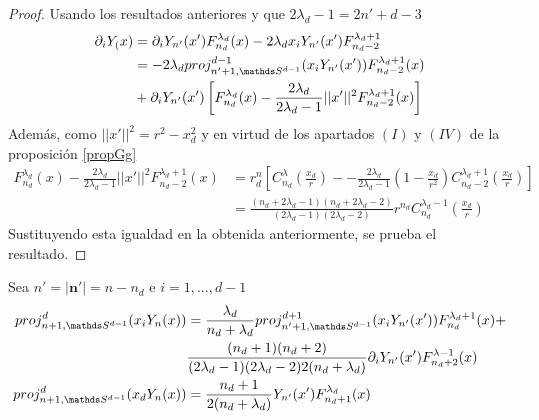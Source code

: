 \begin{proof} Usando los resultados anteriores y que $2\lambda_d-1 = 2n'+d-3$
	$$
	\begin{aligned}\partial_i Y_(x) &= \partial_i Y_{n'}(x')F_{n_d}^{\lambda_d}(x)-2\lambda_d x_i Y_{n'}(x')F_{n_d-2}^{\lambda_d+1}\\ &= -2\lambda_d proj_{n'+1,\sphere}^{d-1}(x_iY_{n'}(x'))F_{n_d-2}^{\lambda_d+1}(x)\\ &+ \partial_iY_{n'}(x')\left[F_{n_d}^{\lambda_d}(x)-\frac{2\lambda_d}{2\lambda_d-1}||x'||^2F_{n_d-2}^{\lambda_d+1}(x)\right]\end{aligned}$$
	Además, como $||x'||^2 = r^2-x_d^2$ y en virtud de los apartados $(I)$ y $(IV)$ de la proposición \ref{propGg}
	$$\begin{aligned}
	F_{n_d}^{\lambda_d}(x) -\frac{2\lambda_d}{2\lambda_d-1}||x'||^2F_{n_d-2}^{\lambda_d+1}(x) &=   r^n_d\left[C_{n_d}^{\lambda}(\frac{x_d}{r}) - -\frac{2\lambda_d}{2\lambda_d-1}(1-\frac{x_d}{r^2})C_{n_d-2}^{\lambda_d+1}(\frac{x_d}{r})\right] \\ &=   \frac{(n_d+2\lambda_d-1)(n_d+2\lambda_d-2)}{(2\lambda_d-1)(2\lambda_d - 2)}r^{n_d}C_{n_d}^{\lambda_d-1}(\frac{x_d}{r})
	\end{aligned}
	$$
	Sustituyendo esta igualdad en la obtenida anteriormente, se prueba el resultado.
\end{proof}
\begin{prop}Sea $n'=|\textbf{n}'|=n-n_d$ e $i=1,...,d-1$
	\begin{gather*}
	\begin{aligned}
		proj_{n+1,\sphere}^d(x_iY_n(x)) &= \frac{\lambda_d}{n_d+\lambda_d} proj_{n'+1,\sphere}^{d+1}(x_iY_{n'}(x'))F_{n_d}^{\lambda_d +1}(x)+\\& \frac{(n_d+1)(n_d+2)}{(2\lambda_d-1)(2\lambda_d-2)2(n_d+\lambda_d)}\partial_iY_{n'}(x')F_{n_d+2}^{\lambda-1}(x)\\
		proj_{n+1,\sphere}^d(x_dY_n(x)) &= \frac{n_d+1}{2(n_d+\lambda_d)}Y_{n'}(x')F_{n_d+1}^{\lambda_d}(x)
	\end{aligned}
	\end{gather*}
\end{prop}
